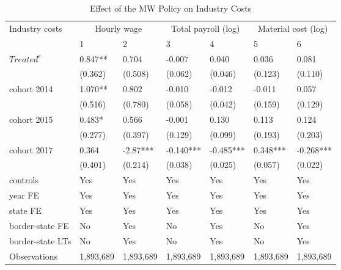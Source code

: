 \begin{table}[H]
    \centering
    \caption{Effect of the MW Policy on Industry Costs}
    \label{tab:state-baseline-industry-costs}
    \begin{tabular}{@{}lllllll@{}}
        \toprule\toprule
        Industry costs & \multicolumn{2}{c}{Hourly wage} & \multicolumn{2}{c}{Total payroll (log)} & \multicolumn{2}{c}{Material cost (log)} \\
        \cmidrule(lr){2-3}\cmidrule(lr){4-5}\cmidrule(lr){6-7}
        & 1         & 2         & 3         & 4         & 5         & 6         \\ \midrule
        $Treated^{e}$    & 0.847**   & 0.704     & -0.007    & 0.040     & 0.036     & 0.081     \\
        & (0.362)   & (0.508)   & (0.062)   & (0.046)   & (0.123)   & (0.110)   \\
        cohort 2014      & 1.070**   & 0.802     & -0.010    & -0.012    & -0.011    & 0.057     \\
        & (0.516)   & (0.780)   & (0.058)   & (0.042)   & (0.159)   & (0.129)   \\
        cohort 2015      & 0.483*    & 0.566     & -0.001    & 0.130     & 0.113     & 0.124     \\
        & (0.277)   & (0.397)   & (0.129)   & (0.099)   & (0.193)   & (0.203)   \\
        cohort 2017      & 0.364     & -2.87***  & -0.140*** & -0.485*** & 0.348***  & -0.268*** \\
        & (0.401)   & (0.214)   & (0.038)   & (0.025)   & (0.057)   & (0.022)   \\
        controls         & Yes       & Yes       & Yes       & Yes       & Yes       & Yes       \\
        year FE          & Yes       & Yes       & Yes       & Yes       & Yes       & Yes       \\
        state FE         & Yes       & Yes       & Yes       & Yes       & Yes       & Yes       \\
        border-state FE  & No        & Yes       & No        & Yes       & No        & Yes       \\
        border-state LTs & No        & Yes       & No        & Yes       & No        & Yes       \\ \midrule
        Observations     & 1,893,689 & 1,893,689 & 1,893,689 & 1,893,689 & 1,893,689 & 1,893,689 \\

\end{tabular}
\end{table}
